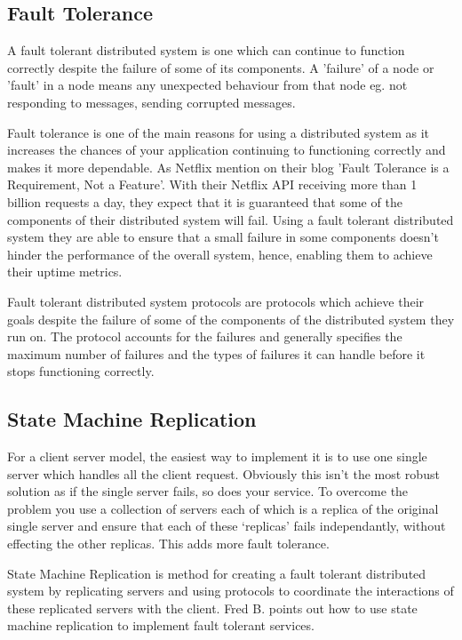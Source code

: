 \subsection{Fault Tolerance}
A fault tolerant distributed system is one which can continue to function correctly
despite the failure of some of its components. A 'failure' of a node or 'fault' in a node
means any unexpected behaviour from that node eg. not responding to messages, sending
corrupted messages.

Fault tolerance is one of the main reasons for using a distributed system as it
increases the chances of your application continuing to functioning correctly and
makes it more dependable. As Netflix mention on their blog
'Fault Tolerance is a Requirement, Not a Feature'.
With their Netflix API receiving more than 1 billion requests a day, they expect
that it is guaranteed that some of the components of their distributed system will fail.
Using a fault tolerant distributed system they are able to ensure that a small failure
in some components doesn't hinder the performance of the overall system, hence,
enabling them to achieve their uptime metrics.

Fault tolerant distributed system protocols are protocols which achieve their
goals despite the failure of some of the components of the distributed system they run on.
The protocol accounts for the failures and generally specifies the maximum number of
failures and the types of failures it can handle before it stops functioning correctly.

\subsection{State Machine Replication}

For a client server model, the easiest way to implement it is to use one single server
which handles all the client request. Obviously this isn't the most robust solution
as if the single server fails, so does your service. To overcome the problem you
use a collection of servers each of which is a replica of the original single server and
ensure that each of these `replicas' fails independantly, without effecting the other replicas.
This adds more fault tolerance.

State Machine Replication is method for creating a fault tolerant distributed system
by replicating servers and using protocols to coordinate the interactions of these
replicated servers with the client. Fred B. \cite{1} points out how to use
state machine replication to implement fault tolerant services.

